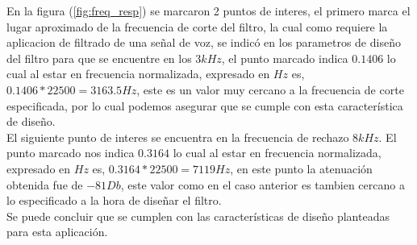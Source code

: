 \documentclass[12pt]{article}
\begin{document}
\begin{enumerate}
\begin{enumerate}
        En la figura (\ref{fig:freq_resp}) se marcaron 2 puntos de interes, el primero marca el lugar aproximado de la frecuencia de corte del filtro, la cual como requiere la aplicacion de filtrado de una señal de voz, se indicó en los parametros de diseño del filtro para que se encuentre en los $3kHz$, el punto marcado indica $0.1406$ lo cual al estar en frecuencia normalizada, expresado en $Hz$ es, $0.1406*22500=3163.5Hz$, este es un valor muy cercano a la frecuencia de corte especificada, por lo cual podemos asegurar que se cumple con esta característica de diseño.
        \\
        El siguiente punto de interes se encuentra en la frecuencia de rechazo $8kHz$. El punto marcado nos indica $0.3164$ lo cual al estar en frecuencia normalizada, expresado en $Hz$ es, $0.3164*22500=7119Hz$, en este punto la atenuación obtenida fue de $-81Db$, este valor como en el caso anterior es tambien cercano a lo especificado a la hora de diseñar el filtro.
        \\
        Se puede concluir que se cumplen con las características de diseño planteadas para esta aplicación.
    \end{enumerate}
\end{enumerate}
\end{document}
